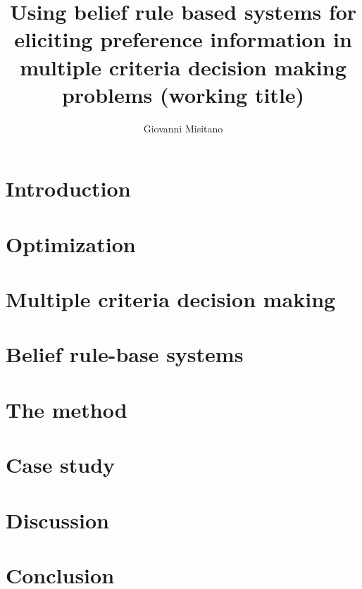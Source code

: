 \documentclass[utf8,english]{gradu3}
\begin{document}
\title{Using belief rule based systems for eliciting preference information in multiple criteria decision making problems (working title)}

\author{Giovanni Misitano}


\maketitle


\mainmatter

\chapter{Introduction}


\chapter{Optimization}


\chapter{Multiple criteria decision making}


\chapter{Belief rule-base systems}


\chapter{The method}


\chapter{Case study}


\chapter{Discussion}


\chapter{Conclusion}


\printbibliography

\appendix

\end{document}
